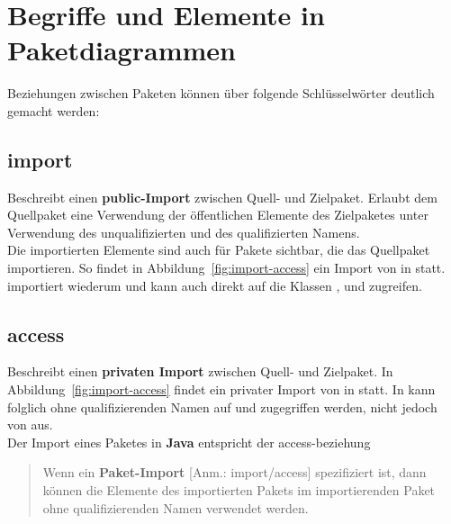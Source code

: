 \section{Begriffe und Elemente in Paketdiagrammen}

Beziehungen zwischen Paketen können über folgende Schlüsselwörter deutlich gemacht werden:

\subsection{\guillemotleft import\guillemotright}
Beschreibt einen \textbf{public-Import} zwischen Quell- und Zielpaket.
Erlaubt dem Quellpaket eine Verwendung der öffentlichen Elemente des Zielpaketes unter Verwendung des unqualifizierten und des qualifizierten Namens.\\
Die importierten Elemente sind auch für Pakete sichtbar, die das Quellpaket importieren.
So findet in Abbildung~\ref{fig:import-access} ein Import von  in  statt.  importiert wiederum  und kann auch direkt auf die Klassen ,  und  zugreifen.\\

\subsection{\guillemotleft access\guillemotright}
Beschreibt einen \textbf{privaten Import} zwischen Quell- und Zielpaket.
In Abbildung~\ref{fig:import-access} findet ein privater Import von  in  statt.
In  kann folglich ohne qualifizierenden Namen auf  und  zugegriffen werden, nicht jedoch von  aus.\\
Der Import eines Paketes in \textbf{Java} entspricht der \guillemotleft access\guillemotright-beziehung

\blockquote[{\cite[307, Hervorhebung i.O.]{Bal05}}]{
Wenn ein \textbf{Paket-Import} [Anm.: import/access] spezifiziert ist, dann können die Elemente des importierten Pakets im importierenden Paket ohne qualifizierenden Namen verwendet werden.
}

